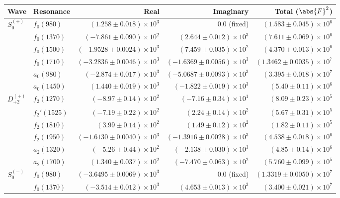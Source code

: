 \begin{table}[ht]
    \begin{center}
        \begin{tabular}{llrrr}\toprule
        Wave & Resonance & Real & Imaginary & Total ($\abs{F}^2$) \\\midrule
$S_{0}^{(+)}$ & $f_{0}(980)$ & $(1.258 \pm 0.018) \times 10^{3}$ & $0.0$ (fixed) & $(1.583 \pm 0.045) \times 10^{6}$ \\
 & $f_{0}(1370)$ & $(-7.861 \pm 0.090) \times 10^{2}$ & $(2.644 \pm 0.012) \times 10^{3}$ & $(7.611 \pm 0.069) \times 10^{6}$ \\
 & $f_{0}(1500)$ & $(-1.9528 \pm 0.0024) \times 10^{3}$ & $(7.459 \pm 0.035) \times 10^{2}$ & $(4.370 \pm 0.013) \times 10^{6}$ \\
 & $f_{0}(1710)$ & $(-3.2836 \pm 0.0046) \times 10^{3}$ & $(-1.6369 \pm 0.0056) \times 10^{3}$ & $(1.3462 \pm 0.0035) \times 10^{7}$ \\
 & $a_{0}(980)$ & $(-2.874 \pm 0.017) \times 10^{3}$ & $(-5.0687 \pm 0.0093) \times 10^{3}$ & $(3.395 \pm 0.018) \times 10^{7}$ \\
 & $a_{0}(1450)$ & $(1.440 \pm 0.019) \times 10^{3}$ & $(-1.822 \pm 0.019) \times 10^{3}$ & $(5.40 \pm 0.11) \times 10^{6}$ \\
$D_{+2}^{(+)}$ & $f_{2}(1270)$ & $(-8.97 \pm 0.14) \times 10^{2}$ & $(-7.16 \pm 0.34) \times 10^{1}$ & $(8.09 \pm 0.23) \times 10^{5}$ \\
 & $f_{2}'(1525)$ & $(-7.19 \pm 0.22) \times 10^{2}$ & $(2.24 \pm 0.14) \times 10^{2}$ & $(5.67 \pm 0.31) \times 10^{5}$ \\
 & $f_{2}(1810)$ & $(3.99 \pm 0.14) \times 10^{2}$ & $(1.49 \pm 0.12) \times 10^{2}$ & $(1.82 \pm 0.11) \times 10^{5}$ \\
 & $f_{2}(1950)$ & $(-1.6130 \pm 0.0040) \times 10^{3}$ & $(-1.3916 \pm 0.0028) \times 10^{3}$ & $(4.538 \pm 0.018) \times 10^{6}$ \\
 & $a_{2}(1320)$ & $(-5.26 \pm 0.44) \times 10^{2}$ & $(-2.138 \pm 0.030) \times 10^{3}$ & $(4.85 \pm 0.14) \times 10^{6}$ \\
 & $a_{2}(1700)$ & $(1.340 \pm 0.037) \times 10^{2}$ & $(-7.470 \pm 0.063) \times 10^{2}$ & $(5.760 \pm 0.099) \times 10^{5}$ \\
$S_{0}^{(-)}$ & $f_{0}(980)$ & $(-3.6495 \pm 0.0069) \times 10^{3}$ & $0.0$ (fixed) & $(1.3319 \pm 0.0050) \times 10^{7}$ \\
 & $f_{0}(1370)$ & $(-3.514 \pm 0.012) \times 10^{3}$ & $(4.653 \pm 0.013) \times 10^{3}$ & $(3.400 \pm 0.021) \times 10^{7}$ \\

\end{tabular}
\end{center}
\end{table}
